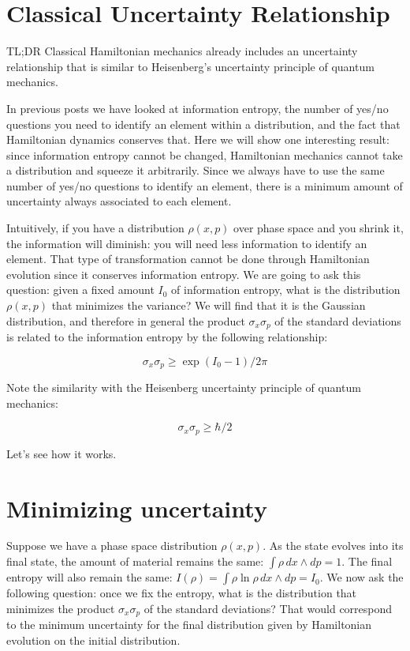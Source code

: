 \documentclass[aps,pra,10pt,floatfix,nofootinbib]{revtex4-1}
\theoremstyle{definition}
\begin{document}
	
\section{Classical Uncertainty Relationship}

TL;DR Classical Hamiltonian mechanics already includes an uncertainty relationship that is similar to Heisenberg's uncertainty principle of quantum mechanics.

In previous posts we have looked at information entropy, the number of yes/no questions you need to identify an element within a distribution, and the fact that Hamiltonian dynamics conserves that. Here we will show one interesting result: since information entropy cannot be changed, Hamiltonian mechanics cannot take a distribution and squeeze it arbitrarily. Since we always have to use the same number of yes/no questions to identify an element, there is a minimum amount of uncertainty always associated to each element.

Intuitively, if you have a distribution $\rho(x,p)$ over phase space and you shrink it, the information will diminish: you will need less information to identify an element. That type of transformation cannot be done through Hamiltonian evolution since it conserves information entropy. We are going to ask this question: given a fixed amount $I_0$ of information entropy, what is the distribution $\rho(x,p)$ that minimizes the variance? We will find that it is the Gaussian distribution, and therefore in general the product $\sigma_x\sigma_p$ of the standard deviations is related to the information entropy by the following relationship:

\begin{equation}
\sigma_x\sigma_p \geq \exp (I_0 - 1) / 2 \pi 
\label{classicalUncertainty}
\end{equation}

Note the similarity with the Heisenberg uncertainty principle of quantum mechanics:

\begin{equation}
\sigma_x\sigma_p \geq \hbar / 2
\label{quantumUncertainty}
\end{equation}

Let's see how it works.

\section{Minimizing uncertainty}

Suppose we have a phase space distribution $\rho(x,p)$. As the state evolves into its final state, the amount of material remains the same: $\int \rho \, dx \wedge dp = 1$. The final entropy will also remain the same: $I(\rho) = \int \rho \ln \rho \, dx \wedge dp = I_0$. We now ask the following question: once we fix the entropy, what is the distribution that minimizes the product $\sigma_x\sigma_p$ of the standard deviations? That would correspond to the minimum uncertainty for the final distribution given by Hamiltonian evolution on the initial distribution.
\end{document}

